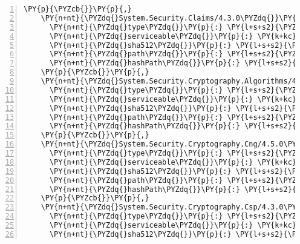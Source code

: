 \begin{Verbatim}[commandchars=\\\{\},numbers=left,firstnumber=1,stepnumber=1,numberblanklines=0]
    \PY{p}{\PYZcb{}}\PY{p}{,}
    \PY{n+nt}{\PYZdq{}System.Security.Claims/4.3.0\PYZdq{}}\PY{p}{:} \PY{p}{\PYZob{}}
      \PY{n+nt}{\PYZdq{}type\PYZdq{}}\PY{p}{:} \PY{l+s+s2}{\PYZdq{}package\PYZdq{}}\PY{p}{,}
      \PY{n+nt}{\PYZdq{}serviceable\PYZdq{}}\PY{p}{:} \PY{k+kc}{true}\PY{p}{,}
      \PY{n+nt}{\PYZdq{}sha512\PYZdq{}}\PY{p}{:} \PY{l+s+s2}{\PYZdq{}sha512\PYZhy{}P/+BR/2lnc4PNDHt/TPBAWHVMLMRHsyYZbU1NphW4HIWzCggz8mJbTQQ3MKljFE7LS3WagmVFuBgoLcFzYXlkA==\PYZdq{}}\PY{p}{,}
      \PY{n+nt}{\PYZdq{}path\PYZdq{}}\PY{p}{:} \PY{l+s+s2}{\PYZdq{}system.security.claims/4.3.0\PYZdq{}}\PY{p}{,}
      \PY{n+nt}{\PYZdq{}hashPath\PYZdq{}}\PY{p}{:} \PY{l+s+s2}{\PYZdq{}system.security.claims.4.3.0.nupkg.sha512\PYZdq{}}
    \PY{p}{\PYZcb{}}\PY{p}{,}
    \PY{n+nt}{\PYZdq{}System.Security.Cryptography.Algorithms/4.3.0\PYZdq{}}\PY{p}{:} \PY{p}{\PYZob{}}
      \PY{n+nt}{\PYZdq{}type\PYZdq{}}\PY{p}{:} \PY{l+s+s2}{\PYZdq{}package\PYZdq{}}\PY{p}{,}
      \PY{n+nt}{\PYZdq{}serviceable\PYZdq{}}\PY{p}{:} \PY{k+kc}{true}\PY{p}{,}
      \PY{n+nt}{\PYZdq{}sha512\PYZdq{}}\PY{p}{:} \PY{l+s+s2}{\PYZdq{}sha512\PYZhy{}W1kd2Y8mYSCgc3ULTAZ0hOP2dSdG5YauTb1089T0/kRcN2MpSAW1izOFROrJgxSlMn3ArsgHXagigyi+ibhevg==\PYZdq{}}\PY{p}{,}
      \PY{n+nt}{\PYZdq{}path\PYZdq{}}\PY{p}{:} \PY{l+s+s2}{\PYZdq{}system.security.cryptography.algorithms/4.3.0\PYZdq{}}\PY{p}{,}
      \PY{n+nt}{\PYZdq{}hashPath\PYZdq{}}\PY{p}{:} \PY{l+s+s2}{\PYZdq{}system.security.cryptography.algorithms.4.3.0.nupkg.sha512\PYZdq{}}
    \PY{p}{\PYZcb{}}\PY{p}{,}
    \PY{n+nt}{\PYZdq{}System.Security.Cryptography.Cng/4.5.0\PYZhy{}rc1\PYZdq{}}\PY{p}{:} \PY{p}{\PYZob{}}
      \PY{n+nt}{\PYZdq{}type\PYZdq{}}\PY{p}{:} \PY{l+s+s2}{\PYZdq{}package\PYZdq{}}\PY{p}{,}
      \PY{n+nt}{\PYZdq{}serviceable\PYZdq{}}\PY{p}{:} \PY{k+kc}{true}\PY{p}{,}
      \PY{n+nt}{\PYZdq{}sha512\PYZdq{}}\PY{p}{:} \PY{l+s+s2}{\PYZdq{}sha512\PYZhy{}39ugbtDgeeM9lEJqAkPqYLScLVXr3fVClocTUIJLPZ0e059LvAVZsYokrGTYUPAnI+fZMoqZuh9VtBUdWWRhgA==\PYZdq{}}\PY{p}{,}
      \PY{n+nt}{\PYZdq{}path\PYZdq{}}\PY{p}{:} \PY{l+s+s2}{\PYZdq{}system.security.cryptography.cng/4.5.0\PYZhy{}rc1\PYZdq{}}\PY{p}{,}
      \PY{n+nt}{\PYZdq{}hashPath\PYZdq{}}\PY{p}{:} \PY{l+s+s2}{\PYZdq{}system.security.cryptography.cng.4.5.0\PYZhy{}rc1.nupkg.sha512\PYZdq{}}
    \PY{p}{\PYZcb{}}\PY{p}{,}
    \PY{n+nt}{\PYZdq{}System.Security.Cryptography.Csp/4.3.0\PYZdq{}}\PY{p}{:} \PY{p}{\PYZob{}}
      \PY{n+nt}{\PYZdq{}type\PYZdq{}}\PY{p}{:} \PY{l+s+s2}{\PYZdq{}package\PYZdq{}}\PY{p}{,}
      \PY{n+nt}{\PYZdq{}serviceable\PYZdq{}}\PY{p}{:} \PY{k+kc}{true}\PY{p}{,}
      \PY{n+nt}{\PYZdq{}sha512\PYZdq{}}\PY{p}{:} \PY{l+s+s2}{\PYZdq{}sha512\PYZhy{}X4s/FCkEUnRGnwR3aSfVIkldBmtURMhmexALNTwpjklzxWU7yjMk7GHLKOZTNkgnWnE0q7+BCf9N2LVRWxewaA==\PYZdq{}}\PY{p}{,}

\end{Verbatim}
